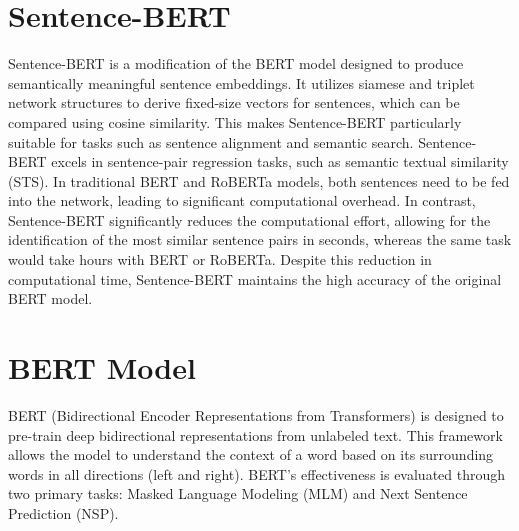 \documentclass[PhD]{PHlab-thesis}
\begin{document}
\section{Sentence-BERT}
Sentence-BERT\cite{reimers2019sentence} is a modification of the BERT model designed to produce semantically meaningful sentence embeddings. It utilizes siamese and triplet network structures to derive fixed-size vectors for sentences, which can be compared using cosine similarity. This makes Sentence-BERT particularly suitable for tasks such as sentence alignment and semantic search.
Sentence-BERT excels in sentence-pair regression tasks, such as semantic textual similarity (STS). In traditional BERT and RoBERTa\cite{liu2019roberta} models, both sentences need to be fed into the network, leading to significant computational overhead. In contrast, Sentence-BERT significantly reduces the computational effort, allowing for the identification of the most similar sentence pairs in seconds, whereas the same task would take hours with BERT or RoBERTa. Despite this reduction in computational time, Sentence-BERT maintains the high accuracy of the original BERT model.\\






\section{BERT Model}
BERT (Bidirectional Encoder Representations from Transformers) is designed to pre-train deep bidirectional representations from unlabeled text.\cite{devlin2018bert} This framework allows the model to understand the context of a word based on its surrounding words in all directions (left and right). BERT's effectiveness is evaluated through two primary tasks: Masked Language Modeling (MLM) and Next Sentence Prediction (NSP).
\end{document}
